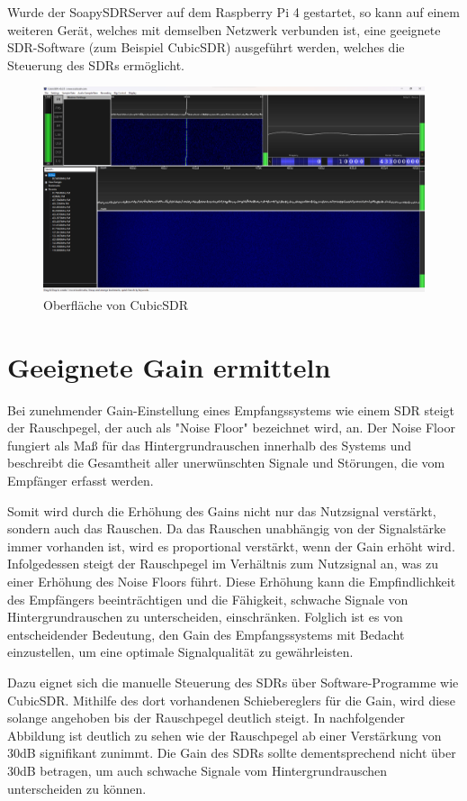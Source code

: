 Wurde der SoapySDRServer auf dem Raspberry Pi 4 gestartet, so kann auf einem weiteren Gerät, welches mit demselben Netzwerk verbunden ist, eine geeignete SDR-Software (zum Beispiel CubicSDR) ausgeführt werden, welches die Steuerung des SDRs ermöglicht.

\begin{figure} [H]
	\centering
	\includegraphics[width=\linewidth]{../ref/OberflaecheCubicSDR.png}
	\caption{Oberfläche von CubicSDR}
	\label{fig:cubicsdr}
\end{figure}


\section{Geeignete Gain ermitteln}
Bei zunehmender Gain-Einstellung eines Empfangssystems wie einem SDR steigt der Rauschpegel, der auch als "Noise Floor" bezeichnet wird, an. Der Noise Floor fungiert als Maß für das Hintergrundrauschen innerhalb des Systems und beschreibt die Gesamtheit aller unerwünschten Signale und Störungen, die vom Empfänger erfasst werden.

Somit wird durch die Erhöhung des Gains nicht nur das Nutzsignal verstärkt, sondern auch das Rauschen. Da das Rauschen unabhängig von der Signalstärke immer vorhanden ist, wird es proportional verstärkt, wenn der Gain erhöht wird. Infolgedessen steigt der Rauschpegel im Verhältnis zum Nutzsignal an, was zu einer Erhöhung des Noise Floors führt. Diese Erhöhung kann die Empfindlichkeit des Empfängers beeinträchtigen und die Fähigkeit, schwache Signale von Hintergrundrauschen zu unterscheiden, einschränken. Folglich ist es von entscheidender Bedeutung, den Gain des Empfangssystems mit Bedacht einzustellen, um eine optimale Signalqualität zu gewährleisten.

Dazu eignet sich die manuelle Steuerung des SDRs über Software-Programme wie CubicSDR. Mithilfe des dort vorhandenen Schiebereglers für die Gain, wird diese solange angehoben bis der Rauschpegel deutlich steigt. In nachfolgender Abbildung ist deutlich zu sehen wie der Rauschpegel ab einer Verstärkung von 30dB signifikant zunimmt. Die Gain des SDRs sollte dementsprechend nicht über 30dB betragen, um auch schwache Signale vom Hintergrundrauschen unterscheiden zu können. 

